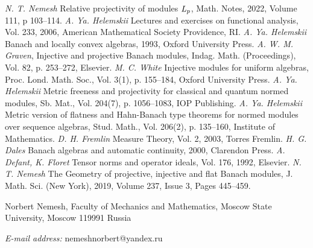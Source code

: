 \documentclass[12pt]{article}
\begin{document}
\begin{thebibliography}{999}
    \textit{N. T. Nemesh} Relative projectivity of 
    modules $\it{L_p}$, Math. Notes, 2022, Volume 111, p 103--114.
    \textit{A. Ya. Helemskii} Lectures and 
    exercises on functional analysis, Vol. 233, {2006}, 
    American Mathematical Society Providence, RI.
    \textit{A. Ya. Helemskii} Banach and locally 
    convex algebras, {1993}, Oxford University Press.
    \textit{A. W. M. Graven}, Injective and 
    projective Banach modules, Indag. Math. (Proceedings), Vol. 82, p. 253--272,
    Elsevier.
    \textit{M. C. White} Injective modules for uniform 
    algebras, Proc. Lond. Math. Soc., Vol. 3(1), p. 155--184, Oxford University 
    Press.
    \textit{A. Ya. Helemskii} Metric freeness and 
    projectivity for classical and quantum normed modules, Sb. Mat., 
    Vol. 204(7), p. 1056--1083, IOP Publishing.
    \textit{A. Ya. Helemskii} Metric version of 
    flatness and Hahn-Banach type theorems for normed modules over sequence 
    algebras, Stud. Math., Vol. 206(2), p. 135--160, Institute of Mathematics.
    \textit{D. H. Fremlin} Measure Theory, Vol. 2,
    {2003}, Torres Fremlin.
    \textit{H. G. Dales} Banach algebras and 
    automatic continuity, {2000}, Clarendon Press.
    \textit{A. Defant, K. Floret} Tensor norms and 
    operator ideals, Vol. 176, {1992}, Elsevier.
    \textit{N. T. Nemesh} The Geometry of 
    projective, injective and flat Banach modules, J. Math. Sci. (New York), 
    2019, Volume 237, Issue 3, Pages 445–459.
\end{thebibliography}

Norbert Nemesh, Faculty of Mechanics and Mathematics, Moscow State University,
Moscow 119991 Russia

\textit{E-mail address:} nemeshnorbert@yandex.ru
\end{document}
